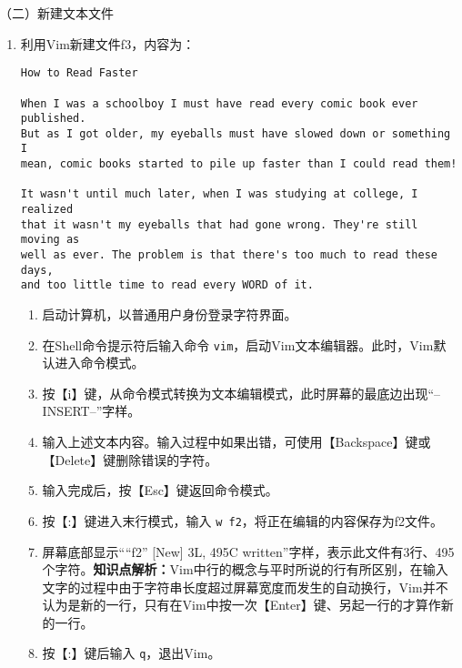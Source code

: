\vspace{0.1in}
（二）新建文本文件
\begin{enumerate}
  \item 利用Vim新建文件f3，内容为：
\begin{verbatim}
How to Read Faster

When I was a schoolboy I must have read every comic book ever published.
But as I got older, my eyeballs must have slowed down or something I
mean, comic books started to pile up faster than I could read them!

It wasn't until much later, when I was studying at college, I realized
that it wasn't my eyeballs that had gone wrong. They're still moving as
well as ever. The problem is that there's too much to read these days,
and too little time to read every WORD of it.
\end{verbatim}
    \begin{enumerate}
      \item 启动计算机，以普通用户身份登录字符界面。
      \item 在Shell命令提示符后输入命令 \verb|vim|，启动Vim文本编辑器。此时，Vim默认进入命令模式。
      \item 按【i】键，从命令模式转换为文本编辑模式，此时屏幕的最底边出现“--INSERT--”字样。
      \item 输入上述文本内容。输入过程中如果出错，可使用【Backspace】键或【Delete】键删除错误的字符。
      \item 输入完成后，按【Esc】键返回命令模式。
      \item 按【:】键进入末行模式，输入 \verb|w f2|，将正在编辑的内容保存为f2文件。
      \item 屏幕底部显示“``f2'' [New] 3L, 495C written”字样，表示此文件有3行、495个字符。\textbf{知识点解析：}Vim中行的概念与平时所说的行有所区别，在输入文字的过程中由于字符串长度超过屏幕宽度而发生的自动换行，Vim并不认为是新的一行，只有在Vim中按一次【Enter】键、另起一行的才算作新的一行。
      \item 按【:】键后输入 \verb|q|，退出Vim。
    \end{enumerate}
\end{enumerate}

